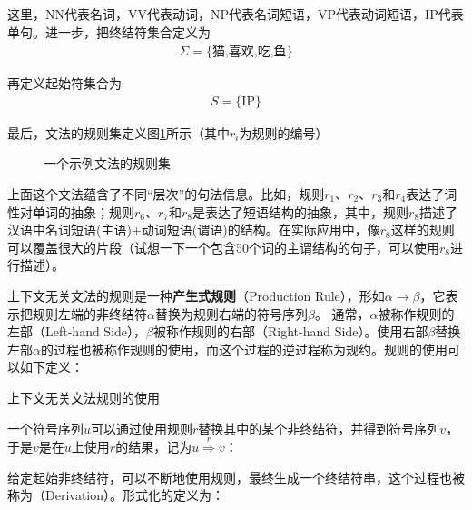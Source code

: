 这里，\textrm{NN}代表名词，\textrm{VV}代表动词，\textrm{NP}代表名词短语，\textrm{VP}代表动词短语，\textrm{IP}代表单句。进一步，把终结符集合定义为
\begin{eqnarray}
\Sigma = \{\text{猫,喜欢,吃,鱼}\} \nonumber
\label{eq:2-43}
\end{eqnarray}

再定义起始符集合为
\begin{eqnarray}
S=\{\textrm{IP}\} \nonumber
\label{eq:2-44}
\end{eqnarray}

最后，文法的规则集定义图\ref{fig:2-21}所示（其中$r_i$为规则的编号）

\begin{figure}[htp]
    \centering

\caption{一个示例文法的规则集}
    \label{fig:2-21}
\end{figure}

\parinterval 上面这个文法蕴含了不同``层次''的句法信息。比如，规则$r_1$、$r_2$、$r_3$和$r_4$表达了词性对单词的抽象；规则$r_6$、$r_7$和$r_8$是表达了短语结构的抽象，其中，规则$r_8$描述了汉语中名词短语(主语)+动词短语(谓语)的结构。在实际应用中，像$r_8$这样的规则可以覆盖很大的片段（试想一下一个包含50个词的主谓结构的句子，可以使用$r_8$进行描述）。

\parinterval 上下文无关文法的规则是一种{\small\sffamily\bfseries{产生式规则}}（Production Rule），形如$\alpha \to \beta $，它表示把规则左端的非终结符$\alpha$替换为规则右端的符号序列$\beta$。 通常，$\alpha$被称作规则的左部（Left-hand Side），$\beta$被称作规则的右部（Right-hand Side）。使用右部$\beta$替换左部$\alpha$的过程也被称作规则的使用，而这个过程的逆过程称为规约。规则的使用可以如下定义：

\vspace{0.5em}
\begin{definition} 上下文无关文法规则的使用

一个符号序列$u$可以通过使用规则$r$替换其中的某个非终结符，并得到符号序列$v$，于是$v$是在$u$上使用$r$的结果，记为$u \overset{r}{\Rightarrow} v$：
\begin{center}

\end{center}
\end{definition}

\parinterval 给定起始非终结符，可以不断地使用规则，最终生成一个终结符串，这个过程也被称为{\small{}}（Derivation）。形式化的定义为：

